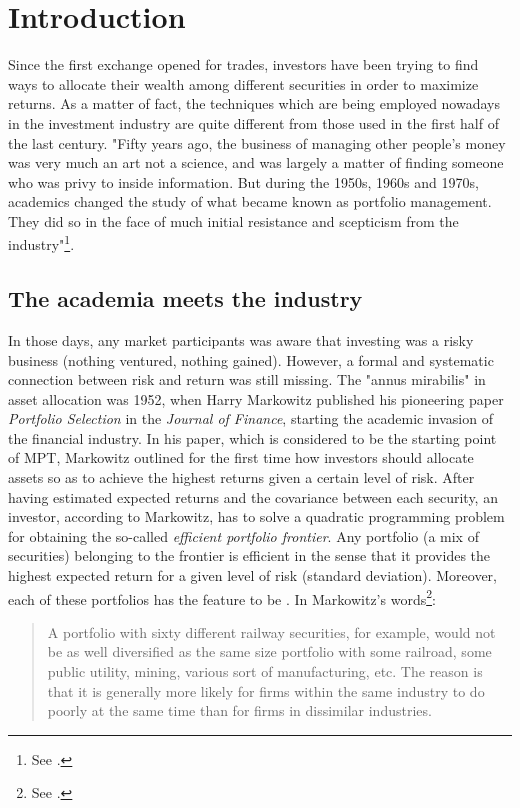 \chapter{Introduction}

Since the first exchange opened for trades, investors have been trying to find ways to allocate their wealth among different securities in order to maximize returns. As a matter of fact, the techniques which are being employed nowadays in the investment industry are quite different from those used in the first half of the last century. "Fifty years ago, the business of managing other people's money was very much an art not a science, and was largely a matter of finding someone who was privy to inside information. But during the 1950s, 1960s and 1970s, academics changed the study of what became known as portfolio management. They did so in the face of much initial resistance and scepticism from the industry"\footnote{See \cite{Econ}.}. 

\section{The academia meets the industry}
In those days, any market participants was aware that investing was a risky business (nothing ventured, nothing gained). However, a formal and systematic connection between risk and return was still missing. The "annus mirabilis" in asset allocation was 1952, when Harry Markowitz published his pioneering paper \textit{Portfolio Selection} in the \textit{Journal of Finance}, starting the academic invasion of the financial industry. In his paper, which is considered to be the starting point of \gls{MPT}, Markowitz outlined for the first time how investors should allocate assets so as to achieve the highest returns given a certain level of risk. After having estimated expected returns and the covariance between each security, an investor, according to Markowitz, has to solve a quadratic programming problem for obtaining the so-called \textit{efficient portfolio frontier}. Any portfolio (a mix of securities) belonging to the frontier is efficient in the sense that it provides the highest expected return for a given level of risk (standard deviation). Moreover, each of these portfolios has the feature to be . In Markowitz's words\footnote{See \cite{bernstein2012}.}:
\begin{quote}
	A portfolio with sixty different railway securities, for example, would not be as well diversified as the same size portfolio with some railroad, some public utility, mining, various sort of manufacturing, etc. The reason is that it is generally more likely for firms within the same industry to do poorly at the same time than for firms in dissimilar industries. 
\end{quote}

